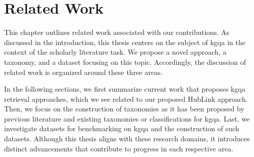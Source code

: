 \chapter{Related Work}
\label{ch:related_work}


This chapter outlines related work associated with our contributions. As discussed in the introduction, this thesis centers on the subject of \gls{kgqa} in the context of the scholarly literature task. We propose a novel approach, a taxonomy, and a dataset focusing on this topic. Accordingly, the discussion of related work is organized around these three areas.

In the following sections, we first summarize current work that proposes \gls{kgqa} retrieval approaches, which we see related to our proposed HubLink approach. Then, we focus on the construction of taxonomies as it has been proposed by previous literature and existing taxonomies or classifications for \gls{kgqa}. Last, we investigate datasets for benchmarking on \gls{kgqa} and the construction of such datasets. Although this thesis aligns with these research domains, it introduces distinct advancements that contribute to progress in each respective area.



